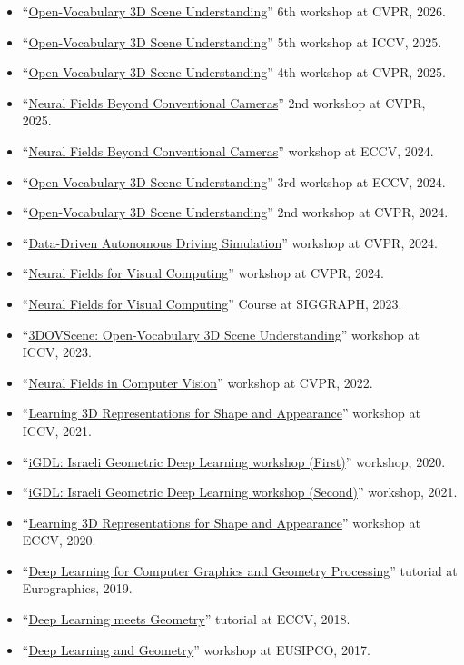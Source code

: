 \begin{itemize}
\item ``\href{https://opensun3d.github.io/index.html}{Open-Vocabulary 3D Scene Understanding}'' 6th workshop at CVPR, 2026.
\item ``\href{https://opensun3d.github.io/index.html}{Open-Vocabulary 3D Scene Understanding}'' 5th workshop at ICCV, 2025.
\item ``\href{https://opensun3d.github.io/index.html}{Open-Vocabulary 3D Scene Understanding}'' 4th workshop at CVPR, 2025.
\item ``\href{https://neural-fields-beyond-cams.github.io/}{Neural Fields Beyond Conventional Cameras}'' 2nd workshop at CVPR, 2025.
\item ``\href{https://neural-bcc.github.io/2024/2024.html}{Neural Fields Beyond Conventional Cameras}'' workshop at ECCV, 2024.
\item ``\href{https://opensun3d.github.io/index_eccv24.html}{Open-Vocabulary 3D Scene Understanding}'' 3rd workshop at ECCV, 2024.
\item ``\href{https://opensun3d.github.io/index_cvpr24.html}{Open-Vocabulary 3D Scene Understanding}'' 2nd workshop at CVPR, 2024.
\item ``\href{https://agents4ad.github.io/}{Data-Driven Autonomous Driving Simulation}'' workshop at CVPR, 2024.
\item ``\href{https://opensun3d.github.io/}{Neural Fields for Visual Computing}'' workshop at CVPR, 2024.
\item ``\href{https://neuralfields.cs.brown.edu/siggraph23.html}{Neural Fields for Visual Computing}'' Course at SIGGRAPH, 2023.
\item ``\href{https://opensun3d.github.io/index_iccv23.html}{3DOVScene: Open-Vocabulary 3D Scene Understanding}'' workshop at ICCV, 2023.
\item ``\href{https://neuralfields.cs.brown.edu/cvpr22.html}{Neural Fields in Computer Vision}'' workshop at CVPR, 2022.
\item ``\href{https://ivl.cs.brown.edu/3DReps/}{Learning 3D Representations for Shape and Appearance}'' workshop at ICCV, 2021.
\item ``\href{https://gdl-israel.github.io/iGDL2020.html}{iGDL: Israeli Geometric Deep Learning workshop (First)}'' workshop, 2020.
\item ``\href{https://gdl-israel.github.io/}{iGDL: Israeli Geometric Deep Learning workshop (Second)}'' workshop, 2021.
\item ``\href{https://geometry.stanford.edu/3DReps/index.html}{Learning 3D Representations for Shape and Appearance}'' workshop at ECCV, 2020.
\item ``\href{https://diglib.eg.org/handle/10.2312/egt20191036}{Deep Learning for Computer Graphics and Geometry Processing}'' tutorial at Eurographics, 2019.
\item ``\href{https://sites.google.com/view/eccv2018fmapstutorial/home}{Deep Learning meets Geometry}'' tutorial at ECCV, 2018.
\item ``\href{https://sites.google.com/view/dlgeometry/home}{Deep Learning and Geometry}'' workshop at EUSIPCO, 2017.
\end{itemize}